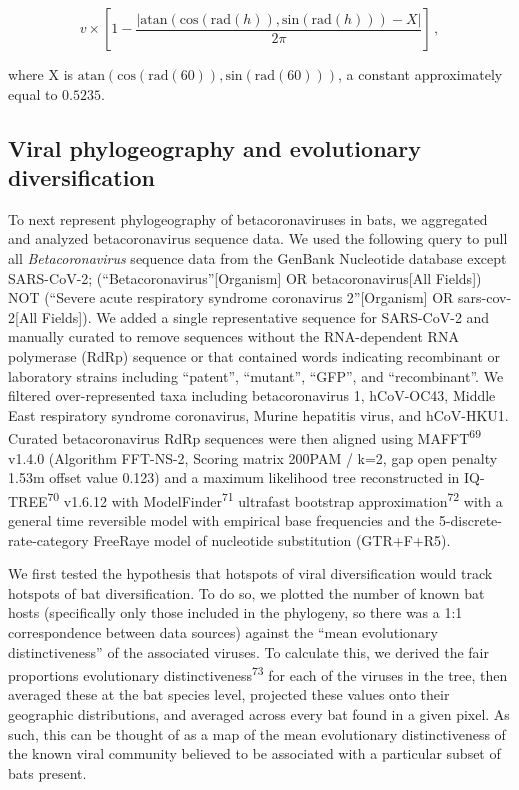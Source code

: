 \documentclass[10pt,oneside]{article}
\begin{document}
\[
v\times\left[1-\frac{\left|\text{atan}\left(\text{cos}(\text{rad}(h)), \text{sin}(\text{rad}(h))\right) - X\right|}{2\pi}\right]\,,
\]

where X is
\(\text{atan}\left(\text{cos}(\text{rad}(60)), \text{sin}(\text{rad}(60))\right)\),
a constant approximately equal to \(0.5235\).

\hypertarget{viral-phylogeography-and-evolutionary-diversification}{%
\subsection{Viral phylogeography and evolutionary
diversification}\label{viral-phylogeography-and-evolutionary-diversification}}

To next represent phylogeography of betacoronaviruses in bats, we
aggregated and analyzed betacoronavirus sequence data. We used the
following query to pull all \emph{Betacoronavirus} sequence data from
the GenBank Nucleotide database except SARS-CoV-2;
(``Betacoronavirus''{[}Organism{]} OR betacoronavirus{[}All Fields{]})
NOT (``Severe acute respiratory syndrome coronavirus 2''{[}Organism{]}
OR sars-cov-2{[}All Fields{]}). We added a single representative
sequence for SARS-CoV-2 and manually curated to remove sequences without
the RNA-dependent RNA polymerase (RdRp) sequence or that contained words
indicating recombinant or laboratory strains including ``patent'',
``mutant'', ``GFP'', and ``recombinant''. We filtered over-represented
taxa including betacoronavirus 1, hCoV-OC43, Middle East respiratory
syndrome coronavirus, Murine hepatitis virus, and hCoV-HKU1. Curated
betacoronavirus RdRp sequences were then aligned using
MAFFT\textsuperscript{69} v1.4.0 (Algorithm FFT-NS-2, Scoring matrix
200PAM / k=2, gap open penalty 1.53m offset value 0.123) and a maximum
likelihood tree reconstructed in IQ-TREE\textsuperscript{70} v1.6.12
with ModelFinder\textsuperscript{71} ultrafast bootstrap
approximation\textsuperscript{72} with a general time reversible model
with empirical base frequencies and the 5-discrete-rate-category
FreeRaye model of nucleotide substitution (GTR+F+R5).

We first tested the hypothesis that hotspots of viral diversification
would track hotspots of bat diversification. To do so, we plotted the
number of known bat hosts (specifically only those included in the
phylogeny, so there was a 1:1 correspondence between data sources)
against the ``mean evolutionary distinctiveness'' of the associated
viruses. To calculate this, we derived the fair proportions evolutionary
distinctiveness\textsuperscript{73} for each of the viruses in the tree,
then averaged these at the bat species level, projected these values
onto their geographic distributions, and averaged across every bat found
in a given pixel. As such, this can be thought of as a map of the mean
evolutionary distinctiveness of the known viral community believed to be
associated with a particular subset of bats present.
\end{document}
